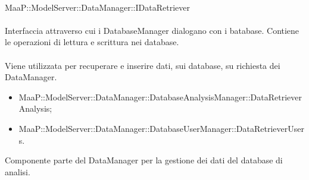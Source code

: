 	\\
	MaaP::ModelServer::DataManager::IDataRetriever\\
	\\
	Interfaccia attraverso cui i DatabaseManager dialogano con i batabase. Contiene le operazioni di lettura e scrittura nei database.\\
	\\
	Viene utilizzata per recuperare e inserire dati, sui database, su richiesta dei DataManager.\\
	\begin{itemize}
	\item MaaP::ModelServer::DataManager::DatabaseAnalysisManager::DataRetrieverAnalysis;
	\item MaaP::ModelServer::DataManager::DatabaseUserManager::DataRetrieverUsers.	
	\end{itemize}

Componente parte del DataManager per la gestione dei dati del database di analisi.


